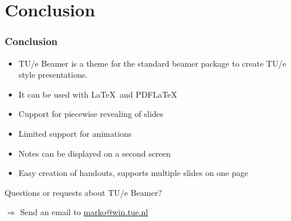 \documentclass[t]{beamer}
\begin{document}
\usebackgroundtemplate{\drawbackground}
\section{Conclusion}
\begin{frame}
\frametitle{Conclusion}

\begin{itemize}
\item TU/e Beamer is a theme for the standard {\sf beamer} package to create TU/e style presentations.
\item It can be used with \LaTeX\ and PDF\LaTeX
\item Cupport for piecewise revealing of slides
\item Limited support for animations
\item Notes can be displayed on a second screen
\item Easy creation of handouts, supports multiple slides on one page
\end{itemize}

Questions or requests about TU/e Beamer?

$\Longrightarrow$ Send an email to \href{mailto:marko@win.tue.nl}{marko@win.tue.nl}
\end{frame}
\end{document}
